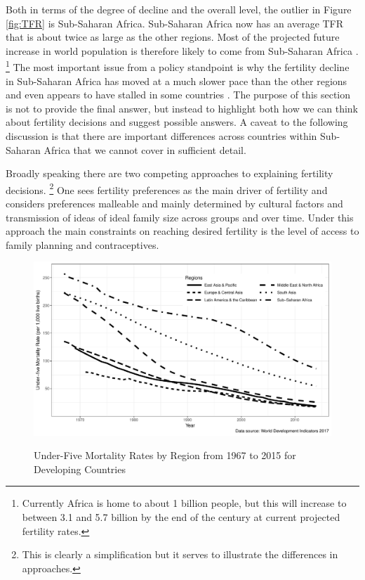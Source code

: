 \documentclass[letterpaper,12pt]{article}
\begin{document}
Both in terms of the degree of decline and the overall level, the
outlier in Figure \ref{fig:TFR} is Sub-Saharan Africa.
Sub-Saharan Africa now has an average TFR that is about twice as large
as the other regions.
Most of the projected future increase in world population is therefore
likely to come from Sub-Saharan Africa \citep{Gerland2014}.%
\footnote{
Currently Africa is home to about 1 billion people, but this will
increase to between 3.1 and 5.7 billion by the end of the century at
current projected fertility rates.}
The most important issue from a policy standpoint is why the fertility
decline in Sub-Saharan Africa has moved at a much slower pace than the
other regions and even appears to have stalled in some countries
\citep{Ainsworth1996a,Singh2017}.
The purpose of this section is not to provide the final answer, but
instead to highlight both how we can think about fertility decisions and
suggest possible answers.
A caveat to the following discussion is that there are important
differences across countries within Sub-Saharan Africa that we
cannot cover in sufficient detail.

Broadly speaking there are two competing approaches to explaining
fertility decisions.%
\footnote{
This is clearly a simplification but it serves to illustrate the
differences in approaches.}
One sees fertility preferences as the main driver of fertility and
considers preferences malleable and mainly determined by cultural
factors and transmission of ideas of ideal family size across groups and
over time.
Under this approach the main constraints on reaching desired fertility
is the level of access to family planning and contraceptives.

\begin{figure}[hp!]
    \centering
    \caption{Under-Five Mortality Rates by Region from 1967 to 2015 for Developing Countries}
    \includegraphics[width=0.95\linewidth]{../figures/childMortalityRatesBW.pdf}
    \label{fig:mortality}
\end{figure}
\end{document}
